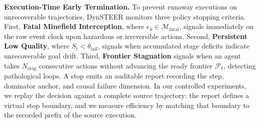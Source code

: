 \textbf{Execution-Time Early Termination.} To prevent runaway executions on unrecoverable trajectories, DynSTEER monitors three policy stopping criteria.
First, \textbf{Fatal Minefield Interception}, where $e_k \in \mathcal{M}_{\text{fatal}}$, signals immediately on the raw event clock upon hazardous or irreversible actions.
Second, \textbf{Persistent Low Quality}, where $S_t < \theta_{\text{fail}}$, signals when accumulated stage deficits indicate unrecoverable goal drift.
Third, \textbf{Frontier Stagnation} signals when an agent takes $N_{\text{stag}}$ consecutive actions without advancing the ready frontier $\mathcal{F}_t$, detecting pathological loops.
A stop emits an auditable report recording the step, dominator anchor, and causal failure dimension.
In our controlled experiments, we replay the decision against a complete source trajectory: the report defines a virtual stop boundary, and we measure efficiency by matching that boundary to the recorded prefix of the source execution.